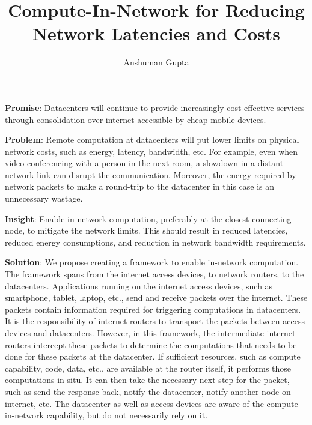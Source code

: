 \documentclass[10pt,letter,twocolumn]{article}
\begin{document}
\title{Compute-In-Network for Reducing Network Latencies and Costs}
\author{Anshuman Gupta}
\date{}

\maketitle

\textbf{Promise}: Datacenters will continue to provide increasingly cost-effective
services through consolidation over internet accessible by cheap mobile devices.

\textbf{Problem}: Remote computation at datacenters will put lower limits on physical
network costs, such as energy, latency, bandwidth, etc. For example, even when video
conferencing with a person in the next room, a slowdown in a distant network link can
disrupt the communication. Moreover, the energy required by network packets to make
a round-trip to the datacenter in this case is an unnecessary wastage.

\textbf{Insight}: Enable in-network computation, preferably at the closest connecting
node, to mitigate the network limits. This should result in reduced latencies, reduced
energy consumptions, and reduction in network bandwidth requirements.

\textbf{Solution}: We propose creating a framework to enable in-network computation.
The framework spans from the internet access devices, to network routers, to the
datacenters. Applications running on the internet access devices, such as smartphone,
tablet, laptop, etc., send and receive packets over the internet. These packets
contain information required for triggering computations in datacenters. It is the
responsibility of internet routers to transport the packets between access devices
and datacenters. However, in this framework, the intermediate internet routers
intercept these packets to determine the computations that needs to be done for
these packets at the datacenter. If sufficient resources, such as compute capability,
code, data, etc., are available at the router itself, it performs those computations
in-situ. It can then take the necessary next step for the packet, such as send the
response back, notify the datacenter, notify another node on internet, etc. The
datacenter as well as access devices are aware of the compute-in-network capability,
but do not necessarily rely on it.
\end{document}
